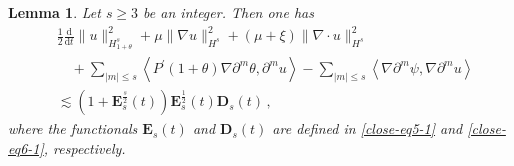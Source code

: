 \documentclass[reqno,11pt]{amsart}
\newtheorem{lemma}{Lemma}[section]
\numberwithin{equation}{section}
\def\d{\mathrm{d}}
\begin{document}
\begin{lemma}\label{Lmm-G5}
    Let $s \ge 3$ be an integer. Then one has
\begin{equation}\label{u-eq-estimate}
\begin{aligned}
& \frac{1}{2} \frac{\d}{\d t} \| u \|_{H_{1+\theta}^s}^2 + \mu \|\nabla u\|_{H^s}^2 + (\mu + \xi) \|\nabla \cdot u\|_{H^s}^2 \\
& \quad + \sum_{|m| \leq s} \left\langle P^\prime(1+\theta) \nabla \partial^m \theta, \partial^m u \right\rangle - \sum_{|m| \leq s} \left\langle \nabla \partial^m \psi, \nabla \partial^m u \right\rangle \\
& \lesssim ( 1 + \mathbf{E}_s^\frac{s}{2} (t) ) \mathbf{E}_s^\frac{1}{2} (t) \mathbf{D}_s (t) \,,
\end{aligned}
\end{equation}
where the functionals $\mathbf{E}_s (t)$ and $\mathbf{D}_s (t)$ are defined in \eqref{close-eq5-1} and \eqref{close-eq6-1}, respectively.
\end{lemma}
\end{document}
